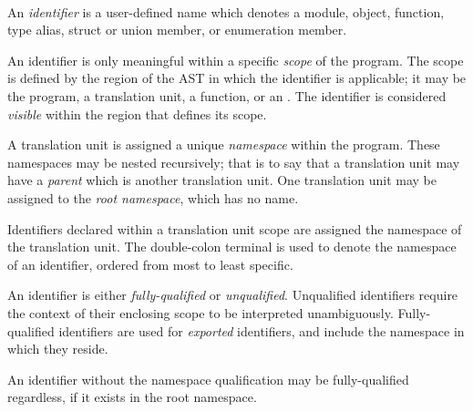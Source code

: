 
\begin{grammar}
\\
 \terminal{::} 
\end{grammar}

\specsubsubitem
An \textit{identifier} is a user-defined name which denotes a module, object,
function, type alias, struct or union member, or enumeration member.

\specsubsubitem
An identifier is only meaningful within a specific \textit{scope} of the
program. The scope is defined by the region of the AST in which the identifier
is applicable; it may be the program, a translation unit, a function, or an
. The identifier is considered \textit{visible}
within the region that defines its scope.

\specsubsubitem
A translation unit is assigned a unique \textit{namespace} within the program.
These namespaces may be nested recursively; that is to say that a translation
unit may have a \textit{parent} which is another translation unit. One
translation unit may be assigned to the \textit{root namespace}, which has no
name.

\specsubsubitem
Identifiers declared within a translation unit scope are assigned the namespace
of the translation unit. The double-colon terminal \terminal{::} is used to
denote the namespace of an identifier, ordered from most to least specific.

\specsubsubitem
An identifier is either \textit{fully-qualified} or \textit{unqualified}.
Unqualified identifiers require the context of their enclosing scope to be
interpreted unambiguously. Fully-qualified identifiers are used for
\textit{exported} identifiers, and include the namespace in which they reside.


\specsubsubitem
An identifier without the namespace qualification may be fully-qualified
regardless, if it exists in the root namespace.
